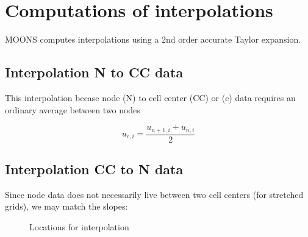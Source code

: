 \documentclass[11pt]{article}
\renewcommand{\height}{0.4}
\renewcommand{\radius}{0.1}
\renewcommand{\offSet}{12}
\renewcommand{\Deltah}{3}
\begin{document}
\doublespacing
\MOONSTITLE
\maketitle

\section{Computations of interpolations}
MOONS computes interpolations using a 2nd order accurate Taylor expansion.

\subsection{Interpolation N to CC data}
This interpolation becase node (N) to cell center (CC) or (c) data requires an ordinary average between two nodes

\begin{equation}
	u_{c,i} = \frac{u_{n+1,i}+u_{n,i}}{2}
\end{equation}

\subsection{Interpolation CC to N data}
Since node data does not necessarily live between two cell centers (for stretched grids), we may match the slopes:

\begin{figure}[H]
  \begin{center}
    \caption{Locations for interpolation}
  \end{center}
\end{figure}
\end{document}
